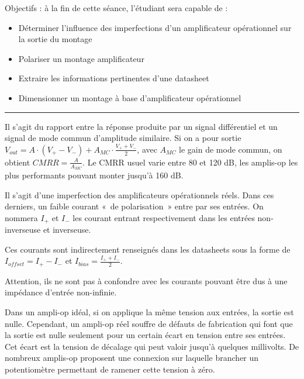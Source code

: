 \documentclass{../template/tp}
\author{The Fantastic Four}
\begin{document}

\vspace{-1cm}
Objectifs : à la fin de cette séance, l'étudiant sera capable de :
\begin{itemize}
\item Déterminer l'influence des imperfections d'un amplificateur opérationnel sur la sortie du montage
\item Polariser un montage amplificateur
\item Extraire les informations pertinentes d'une datasheet
\item Dimensionner un montage à base d'amplificateur opérationnel
\end{itemize}
\rule{\linewidth}{.5pt}


{
	Il s'agit du rapport entre la réponse produite par un signal différentiel et un signal de mode commun d'amplitude similaire.
	Si on a pour sortie $V_{out} = A\cdot (V_+ - V_-) + A_{MC} \cdot \frac{V_+ + V_-}{2}$, avec $A_{MC}$ le gain de mode commun, on obtient $CMRR = \frac{A}{A_{MC}}$.
	Le \textsc{CMRR} usuel varie entre 80 et 120 dB, les amplis-op les plus performants pouvant monter jusqu'à 160 dB.
}

{
	Il s'agit d'une imperfection des amplificateurs opérationnels réels.
	Dans ces derniers, un faible courant «~de polarisation~» entre par ses entrées.
	On nommera $I_+$ et $I_-$ les courant entrant respectivement dans les entrées non-inverseuse et inverseuse.

	Ces courants sont indirectement renseignés dans les datasheets sous la forme de $I_{offset} = I_+ - I_-$ et $I_{bias} = \frac{I_+ + I_-}{2}$.

	Attention, ils ne sont pas à confondre avec les courants pouvant être dus à une impédance d'entrée non-infinie.
}

{
	Dans un ampli-op idéal, si on applique la même tension aux entrées, la sortie est nulle.
	Cependant, un ampli-op réel souffre de défauts de fabrication qui font que la sortie est nulle seulement pour un certain écart en tension entre ses entrées.
	Cet écart est la tension de décalage qui peut valoir jusqu'à quelques millivolts.
	De nombreux amplis-op proposent une connexion sur laquelle brancher un potentiomètre permettant de ramener cette tension à zéro.
}
\end{document}
